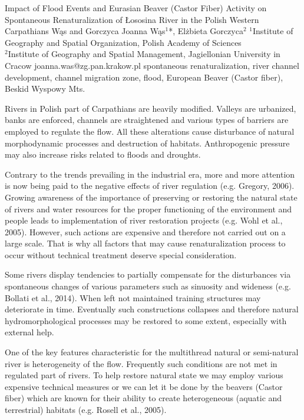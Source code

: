 \abstract
{Impact of Flood Events and Eurasian Beaver (Castor Fiber) Activity on Spontaneous Renaturalization of Łososina River in the Polish Western Carpathians} %
{Wąs and Gorczyca} %
{Joanna Wąs$^1$*, Elżbieta Gorczyca$^2$} %
{\KLtag} %
{$^1$Institute of Geography and Spatial Organization, Polish Academy of Sciences\\
	$^2$Institute of Geography and Spatial Management, Jagiellonian University in Cracow} %
{joanna.was@zg.pan.krakow.pl}  %
{spontaneous renaturalization, river channel development, channel migration zone, flood, European Beaver (Castor fiber), Beskid Wyspowy Mts.}%
{Rivers in Polish part of Carpathians are heavily modified. Valleys are urbanized, banks are enforced, channels are straightened and various types of barriers are employed to regulate the flow. All these alterations cause disturbance of natural morphodynamic processes and destruction of habitats. Anthropogenic pressure may also increase risks related to floods and droughts.

Contrary to the trends prevailing in the industrial era, more and more attention is now being paid to the negative effects of river regulation (e.g. Gregory, 2006). Growing awareness of the importance of preserving or restoring the natural state of rivers and water resources for the proper functioning of the environment and people leads to implementation of river restoration projects (e.g. Wohl et al., 2005). However, such actions are expensive and therefore not carried out on a large scale. That is why all factors that may cause renaturalization process to occur without technical treatment deserve special consideration.

Some rivers display tendencies to partially compensate for the disturbances via spontaneous changes of various parameters such as sinuosity and wideness (e.g. Bollati et al., 2014). When left not maintained training structures may deteriorate in time. Eventually such constructions collapses and therefore natural hydromorphological processes may be restored to some extent, especially with external help.

One of the key features characteristic for the multithread natural or semi-natural river is heterogeneity of the flow. Frequently such conditions are not met in regulated part of rivers. To help restore natural state we may employ various expensive technical measures or we can let it be done by the beavers (Castor fiber) which are known for their ability to create heterogeneous (aquatic and terrestrial) habitats (e.g. Rosell et al., 2005).

}
